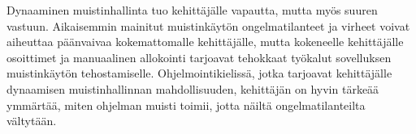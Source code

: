 Dynaaminen muistinhallinta tuo kehittäjälle vapautta, mutta myös suuren vastuun. Aikaisemmin mainitut muistinkäytön ongelmatilanteet ja virheet voivat aiheuttaa päänvaivaa kokemattomalle kehittäjälle, mutta kokeneelle kehittäjälle osoittimet ja manuaalinen allokointi tarjoavat tehokkaat työkalut sovelluksen muistinkäytön tehostamiselle. Ohjelmointikielissä, jotka tarjoavat kehittäjälle dynaamisen muistinhallinnan mahdollisuuden, kehittäjän on hyvin tärkeää ymmärtää, miten ohjelman muisti toimii, jotta näiltä ongelmatilanteilta vältytään.



